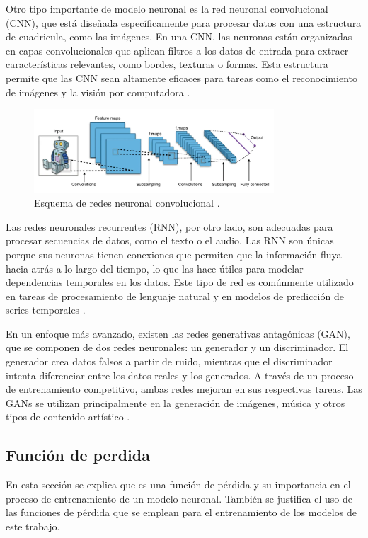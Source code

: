 Otro tipo importante de modelo neuronal es la red neuronal convolucional (CNN), que está diseñada específicamente para procesar datos con una estructura de cuadricula, como las imágenes. En una CNN, las neuronas están organizadas en capas convolucionales que aplican filtros a los datos de entrada para extraer características relevantes, como bordes, texturas o formas. Esta estructura permite que las CNN sean altamente eficaces para tareas como el reconocimiento de imágenes y la visión por computadora \cite{goodfellow2016deep}.


\begin{figure}[H]
    \centering
    \includegraphics[width=0.8\textwidth]{./img/modelo/CNN.png}
    \caption{Esquema de redes neuronal convolucional \cite{uniteai2020cnn}.}
    \label{fig:esq-CNN}
\end{figure}


Las redes neuronales recurrentes (RNN), por otro lado, son adecuadas para procesar secuencias de datos, como el texto o el audio. Las RNN son únicas porque sus neuronas tienen conexiones que permiten que la información fluya hacia atrás a lo largo del tiempo, lo que las hace útiles para modelar dependencias temporales en los datos. Este tipo de red es comúnmente utilizado en tareas de procesamiento de lenguaje natural y en modelos de predicción de series temporales \cite{haykin2009neural}.

En un enfoque más avanzado, existen las redes generativas antagónicas (GAN), que se componen de dos redes neuronales: un generador y un discriminador. El generador crea datos falsos a partir de ruido, mientras que el discriminador intenta diferenciar entre los datos reales y los generados. A través de un proceso de entrenamiento competitivo, ambas redes mejoran en sus respectivas tareas. Las GANs se utilizan principalmente en la generación de imágenes, música y otros tipos de contenido artístico \cite{nielsen2015neural}.

\subsection{Función de perdida}
En esta sección se explica que es una función de pérdida y su importancia en el proceso de entrenamiento de un modelo neuronal. También se justifica el uso de las funciones de pérdida que se emplean para el entrenamiento de los modelos de este trabajo.

